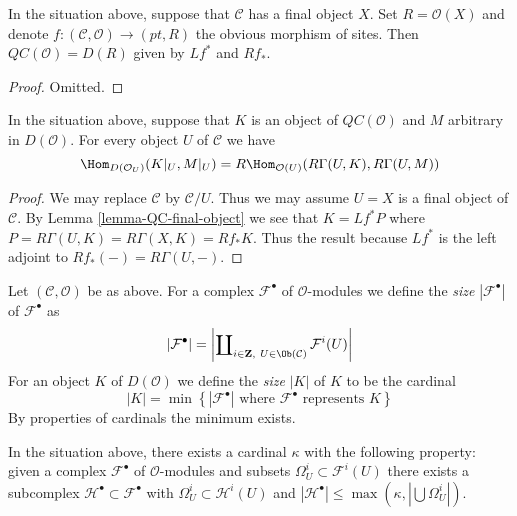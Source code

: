 \begin{lemma}
\label{lemma-QC-final-object}
In the situation above, suppose that $\mathcal{C}$ has a final object $X$.
Set $R = \mathcal{O}(X)$ and denote
$f : (\mathcal{C}, \mathcal{O}) \to (pt, R)$ the obvious morphism of sites.
Then $\mathit{QC}(\mathcal{O}) = D(R)$ given by $Lf^*$ and $Rf_*$.
\end{lemma}

\begin{proof}
Omitted.
\end{proof}

\begin{lemma}
\label{lemma-QC-hom-out-of}
In the situation above, suppose that $K$ is an object of
$\mathit{QC}(\mathcal{O})$ and $M$ arbitrary in $D(\mathcal{O})$.
For every object $U$ of $\mathcal{C}$ we have
$$
\Hom_{D(\mathcal{O}_U)}(K|_U, M|_U) =
R\Hom_{\mathcal{O}(U)}(R\Gamma(U, K), R\Gamma(U, M))
$$
\end{lemma}

\begin{proof}
We may replace $\mathcal{C}$ by $\mathcal{C}/U$. Thus we may assume
$U = X$ is a final object of $\mathcal{C}$. By
Lemma \ref{lemma-QC-final-object} we see that $K = Lf^*P$
where $P = R\Gamma(U, K) = R\Gamma(X, K) = Rf_*K$.
Thus the result because $Lf^*$
is the left adjoint to $Rf_*(-) = R\Gamma(U, -)$.
\end{proof}

\noindent
Let $(\mathcal{C}, \mathcal{O})$ be as above. For a complex
$\mathcal{F}^\bullet$ of $\mathcal{O}$-modules we define the
{\it size} $|\mathcal{F}^\bullet|$ of $\mathcal{F}^\bullet$ as
$$
|\mathcal{F}^\bullet| =
\left|
\coprod\nolimits_{i \in \mathbf{Z},\ U \in \Ob(\mathcal{C})} \mathcal{F}^i(U)
\right|
$$
For an object $K$ of
$D(\mathcal{O})$ we define the {\it size} $|K|$ of $K$ to be the
cardinal
$$
|K| = \min
\left\{
\left|
\mathcal{F}^\bullet
\right|
\text{ where }\mathcal{F}^\bullet\text{ represents }K
\right\}
$$
By properties of cardinals the minimum exists.

\begin{lemma}
\label{lemma-build-from}
In the situation above, there exists a cardinal $\kappa$ with the
following property: given a complex $\mathcal{F}^\bullet$ of
$\mathcal{O}$-modules and subsets $\Omega^i_U \subset \mathcal{F}^i(U)$
there exists a subcomplex $\mathcal{H}^\bullet \subset \mathcal{F}^\bullet$
with $\Omega^i_U \subset \mathcal{H}^i(U)$ and
$|\mathcal{H}^\bullet| \leq \max(\kappa, |\bigcup \Omega^i_U|)$.
\end{lemma}

